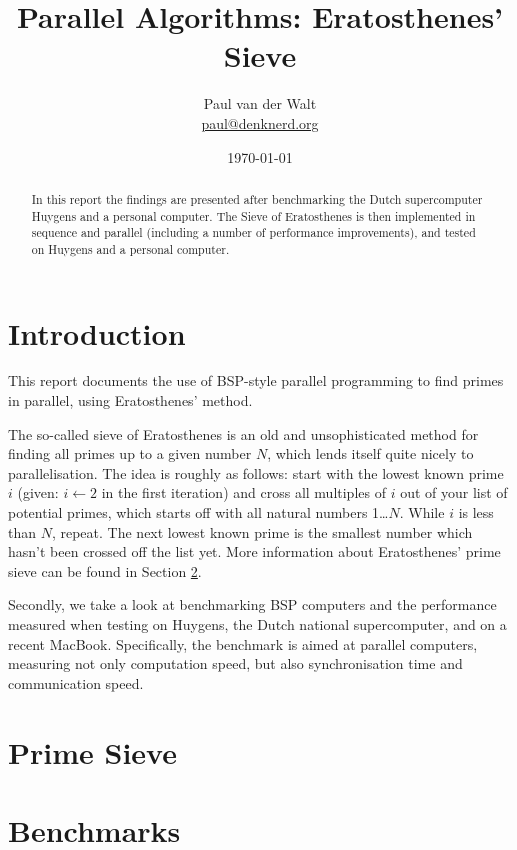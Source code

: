 \documentclass[a4paper]{article}
\author{Paul van der Walt\\\url{paul@denknerd.org}}
\date{\today}
\title{Parallel Algorithms: Eratosthenes' Sieve}
\begin{document}
\maketitle
\begin{abstract}
    In this report the findings are presented after benchmarking the Dutch
    supercomputer Huygens and a personal computer. The Sieve of Eratosthenes is
    then implemented in sequence and parallel (including a number of performance
    improvements), and tested on Huygens and a
    personal computer. 
\end{abstract}
\tableofcontents

\section{Introduction}

This report documents the use of BSP-style\cite{BSP} parallel programming to
find primes in parallel, using Eratosthenes' method. 

The so-called sieve of Eratosthenes is an old and unsophisticated method for
finding all primes up to a given number $N$, which lends itself quite nicely to
parallelisation. The idea is roughly as follows: start with the lowest known
prime $i$ (given: $i \leftarrow 2$ in the first iteration) and cross all
multiples of $i$ out of your list of potential primes, which starts off with all
natural numbers 1\ldots$N$. While $i$ is less than $N$, repeat. The next lowest
known prime is the smallest number which hasn't been crossed off the list yet.
More information about Eratosthenes' prime sieve can be found in Section
\ref{sec:sieve}. 

Secondly, we take a look at benchmarking BSP computers and the performance
measured when testing on Huygens\cite{sarahuygens}, the Dutch national
supercomputer, and on a recent MacBook. Specifically, the benchmark is aimed at
parallel computers, measuring not only computation speed, but also
synchronisation time and communication speed. 



\section{Prime Sieve}\label{sec:sieve}


\section{Benchmarks}
\end{document}
